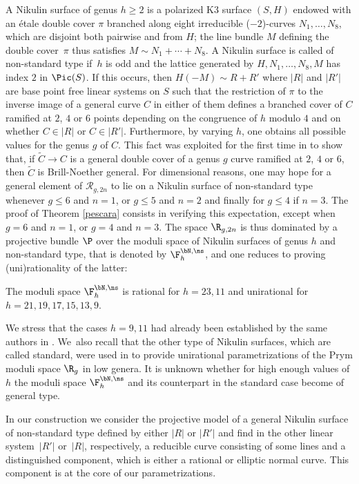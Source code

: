 A Nikulin surface of genus $h\geq 2$ is a polarized K3 surface $(S,H)$ endowed with an étale double cover $\pi$ branched along eight irreducible ($-2$)-curves $N_1,\ldots,N_8$, which are disjoint both pairwise and from $H$; the line bundle $M$ defining the double cover~$\pi$ thus satisfies $M\sim N_1+\cdots+N_8$. A Nikulin surface is called of non-standard type if~$h$ is odd and the lattice generated by $H,N_1,\ldots,N_8,M$ has index $2$ in $\Pic(S)$. If this occurs, then $H(-M)\sim R+R'$ where $|R|$ and $|R'|$ are base point free linear systems on $S$ \cite{GS} such that the restriction of $\pi$ to the inverse image of a general curve $C$ in either of them defines a branched cover of $C$ ramified at $2$, $4$ or $6$ points depending on the congruence of $h$ modulo $4$ and on whether $C\in |R|$ or $C\in |R'|$. Furthermore, by varying $h$, one obtains all possible values for the genus $g$ of $C$. This fact was exploited for the first time in \cite{DL} to show that, if $\widetilde C\to C$ is a general double cover of a genus $g$ curve ramified at $2$, $4$ or $6$, then $\widetilde C$ is Brill-Noether general.
For dimensional reasons, one may hope for a general element of $\mathcal R_{g,2n}$ to lie on a Nikulin surface of non-standard type whenever $g\leq 6$ and $n=1$, or $g\leq 5$ and $n=2$ and finally for $g\leq 4$ if $n=3$. The proof of Theorem \ref{pescara} consists in verifying this expectation, except when $g=6$ and $n=1$, or $g=4$ and $n=3$. The space $\R_{g,2n}$ is thus dominated by a projective bundle $\P$ over the moduli space of Nikulin surfaces of genus $h$ and non-standard type, that is denoted by $\F_h^{\bN,\ns}$, and one reduces to proving (uni)rationality of the latter:
\begin{thm}\label{moduli}
The moduli space $\F_h^{\bN,\ns}$ is rational for $h=23,11$ and unirational for $h=21,19,17, 15,13,9$.
\end{thm}
We stress that the cases $h=9,11$ had already been established by the same authors in \cite{KLV2}. We~also recall that the other type of Nikulin surfaces, which are called standard, were used in \cite{FV1} to provide unirational parametrizations of the Prym moduli space $\R_g$ in low genera.
It is unknown whether for high enough values of $h$ the moduli space $\F_h^{\bN,\ns}$ and its counterpart in the standard case become of general type.

In our construction we consider the projective model of a general Nikulin surface of non-standard type defined by either $|R|$ or $|R'|$ and find in the other linear system~$|R'|$ or~$|R|$, respectively, a reducible curve consisting of some lines and a distinguished component, which is either a rational or elliptic normal curve. This component is at the core of our parametrizations.

